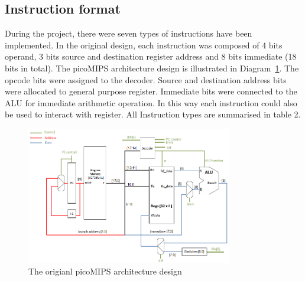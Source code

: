 \subsection{Instruction format}\label{Section:Instruction format}
During the project, there were seven types of instructions have been implemented. In the original design, each instruction was composed of 4 bits operand, 3 bits source and destination register address and 8 bits immediate (18 bits in total). The picoMIPS architecture design is illustrated in Diagram~\ref{fig:oldarc}. The opcode bits were assigned to the decoder. Source and destination address bits were allocated to general purpose register. Immediate bits were connected to the ALU for immediate arithmetic operation. In this way each instruction could also be used to interact with register. All Instruction types are summarised in table 2.
\begin{figure}[H]
		\centering
		\includegraphics[width = 0.8\textwidth]{Figures/oldarch}		
		\caption{The origianl picoMIPS architecture design \cite{oldarcdigram}}
		\label {fig:oldarc}
\end{figure}

